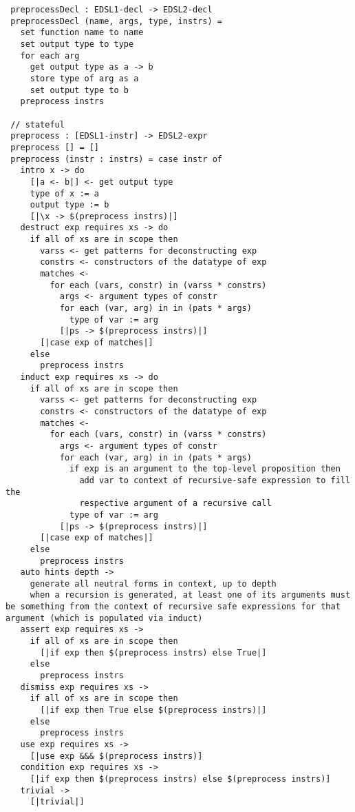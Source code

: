  \begin{verbatim}
 preprocessDecl : EDSL1-decl -> EDSL2-decl
 preprocessDecl (name, args, type, instrs) =
   set function name to name
   set output type to type
   for each arg
     get output type as a -> b 
     store type of arg as a
     set output type to b
   preprocess instrs
  
 // stateful
 preprocess : [EDSL1-instr] -> EDSL2-expr
 preprocess [] = []
 preprocess (instr : instrs) = case instr of 
   intro x -> do
     [|a <- b|] <- get output type
     type of x := a
     output type := b
     [|\x -> $(preprocess instrs)|]
   destruct exp requires xs -> do
     if all of xs are in scope then 
       varss <- get patterns for deconstructing exp
       constrs <- constructors of the datatype of exp
       matches <- 
         for each (vars, constr) in (varss * constrs)
           args <- argument types of constr
           for each (var, arg) in in (pats * args)
             type of var := arg
           [|ps -> $(preprocess instrs)|]
       [|case exp of matches|]
     else
       preprocess instrs
   induct exp requires xs -> do
     if all of xs are in scope then 
       varss <- get patterns for deconstructing exp
       constrs <- constructors of the datatype of exp
       matches <-
         for each (vars, constr) in (varss * constrs)
           args <- argument types of constr
           for each (var, arg) in in (pats * args)
             if exp is an argument to the top-level proposition then
               add var to context of recursive-safe expression to fill the
               respective argument of a recursive call
             type of var := arg
           [|ps -> $(preprocess instrs)|]
       [|case exp of matches|]
     else
       preprocess instrs
   auto hints depth ->
     generate all neutral forms in context, up to depth
     when a recursion is generated, at least one of its arguments must be something from the context of recursive safe expressions for that argument (which is populated via induct)
   assert exp requires xs ->
     if all of xs are in scope then
       [|if exp then $(preprocess instrs) else True|]
     else
       preprocess instrs
   dismiss exp requires xs ->
     if all of xs are in scope then
       [|if exp then True else $(preprocess instrs)|]
     else
       preprocess instrs
   use exp requires xs -> 
     [|use exp &&& $(preprocess instrs)]
   condition exp requires xs ->
     [|if exp then $(preprocess instrs) else $(preprocess instrs)]
   trivial ->
     [|trivial|]
  
  
 \end{verbatim}
  
